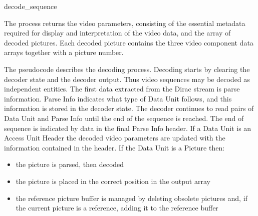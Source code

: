 \begin{pseudo}{decode\_sequence}{}
   \bsCODE{\SeqStateName = \{\}}
   \bsCODE{\RefBuffer=\{\}}
   \bsCODE{\RetiredPictureList=\{\}}
         \bsEND
      \bsEND
   \bsEND
\end{pseudo}

The process returns the video parameters, consisting of the essential metadata required for 
display and interpretation of the video data, and the array of decoded pictures. Each decoded
picture contains the three video component data arrays together with a picture number.

The pseudocode describes the decoding process. Decoding starts by clearing the decoder state 
and the decoder output. Thus video sequences may be decoded as independent entities. The 
first data extracted from the Dirac stream is parse information. Parse Info indicates what type of 
Data Unit follows, and this information is stored in the decoder state. The decoder continues to read
 pairs of Data Unit and Parse Info until the end of the sequence is reached. The end of sequence 
is indicated by data in the final Parse Info header. If a Data Unit is an Access Unit Header the 
decoded video parameters are updated with the information contained in the header. If the 
Data Unit is a Picture then:
\begin{itemize}
\item the picture is parsed, then decoded
\item the picture is placed in the correct position in the output array
\item the reference picture buffer is managed by deleting obsolete pictures and, if the current picture
is a reference, adding it to the reference buffer
\end{itemize}

